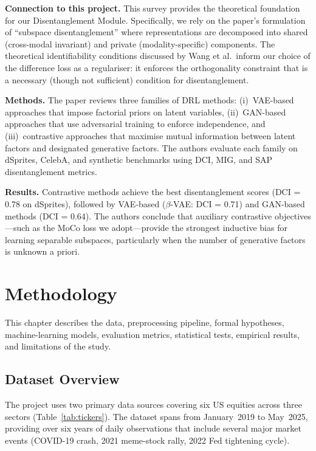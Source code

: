 \documentclass[12pt, a4paper]{article}
\begin{document}
\textbf{Connection to this project.}
This survey provides the theoretical foundation for our Disentanglement Module. Specifically, we rely on the paper's formulation of ``subspace disentanglement'' where representations are decomposed into shared (cross-modal invariant) and private (modality-specific) components. The theoretical identifiability conditions discussed by Wang et al.\ inform our choice of the difference loss as a regulariser: it enforces the orthogonality constraint that is a necessary (though not sufficient) condition for disentanglement.

\textbf{Methods.}
The paper reviews three families of DRL methods: (i)~VAE-based approaches that impose factorial priors on latent variables, (ii)~GAN-based approaches that use adversarial training to enforce independence, and (iii)~contrastive approaches that maximise mutual information between latent factors and designated generative factors. The authors evaluate each family on dSprites, CelebA, and synthetic benchmarks using DCI, MIG, and SAP disentanglement metrics.

\textbf{Results.}
Contrastive methods achieve the best disentanglement scores (DCI = 0.78 on dSprites), followed by VAE-based ($\beta$-VAE: DCI = 0.71) and GAN-based methods (DCI = 0.64). The authors conclude that auxiliary contrastive objectives---such as the MoCo loss we adopt---provide the strongest inductive bias for learning separable subspaces, particularly when the number of generative factors is unknown a priori.


\section{Methodology}
\label{sec:method}

This chapter describes the data, preprocessing pipeline, formal hypotheses, machine-learning models, evaluation metrics, statistical tests, empirical results, and limitations of the study.

\subsection{Dataset Overview}

The project uses two primary data sources covering six US equities across three sectors (Table~\ref{tab:tickers}). The dataset spans from January~2019 to May~2025, providing over six years of daily observations that include several major market events (COVID-19 crash, 2021 meme-stock rally, 2022 Fed tightening cycle).
\end{document}
